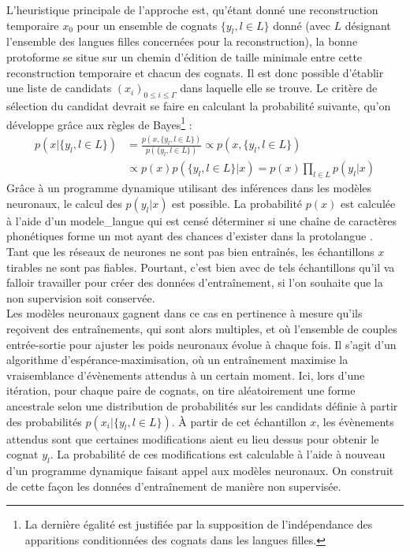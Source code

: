 \documentclass[12pt, twoside]{report}
\begin{document}
L'heuristique principale de l'approche est, qu'étant donné une reconstruction temporaire $x_0$ pour un ensemble de \glspl{cognat} $\{y_l, l\in L \}$ donné (avec $L$ désignant l'ensemble des langues filles concernées pour la reconstruction), la bonne \gls{protoforme} se situe sur un chemin d'édition de taille minimale entre cette reconstruction temporaire et chacun des \glspl{cognat}. Il est donc possible d'établir une liste de candidats $(x_i)_{0\leq{}i\leq{}\Gamma}$ dans laquelle elle se trouve. Le critère de sélection du candidat devrait se faire en calculant la probabilité suivante, qu'on développe grâce aux règles de Bayes\footnote{La dernière égalité est justifiée par la supposition de l'indépendance des apparitions conditionnées des \glspl{cognat} dans les langues filles.} :
\begin{equation} \label{probaSampling}
    \begin{split}
        p(x|\{y_l, l \in L\}) & = \frac{p(x, \{y_l, l \in L\})}{p(\{y_l, l \in L\})} \propto p(x, \{y_l, l \in L\})\\
        & \propto p(x)p(\{y_l, l \in L\}|x) = p(x)\prod_{l\in L} p(y_l|x)
    \end{split}
\end{equation}
Grâce à un programme dynamique utilisant des inférences dans les modèles neuronaux, le calcul des $p(y_l|x)$ est possible. La probabilité $p(x)$ est calculée à l'aide d'un \gls{modele_langue} qui est censé déterminer si une chaîne de caractères phonétiques forme un mot ayant des chances d'exister dans la protolangue \autocite[section 5]{he2022neural}.\\

Tant que les réseaux de neurones ne sont pas bien entraînés, les échantillons $x$ tirables ne sont pas fiables. Pourtant, c'est bien avec de tels échantillons qu'il va falloir travailler pour créer des données d'entraînement, si l'on souhaite que la non supervision soit conservée.\\
Les modèles neuronaux gagnent dans ce cas en pertinence à mesure qu'ils reçoivent des entraînements, qui sont alors multiples, et où l'ensemble de couples entrée-sortie pour ajuster les poids neuronaux évolue à chaque fois. Il s'agit d'un algorithme d'espérance-maximisation\autocite{EM}, où un entraînement maximise la vraisemblance d'évènements attendus à un certain moment. Ici, lors d'une itération, pour chaque paire de \glspl{cognat}, on tire aléatoirement une forme ancestrale selon une distribution de probabilités sur les candidats définie à partir des probabilités $p(x_i|\{y_l, l \in L\})$. À partir de cet échantillon $x$, les évènements attendus sont que certaines modifications aient eu lieu dessus pour obtenir le \gls{cognat} $y_l$. La probabilité de ces modifications est calculable à l'aide à nouveau d'un programme dynamique faisant appel aux modèles neuronaux. On construit de cette façon les données d'entraînement de manière non supervisée.\autocite[section 6]{he2022neural}
\end{document}
